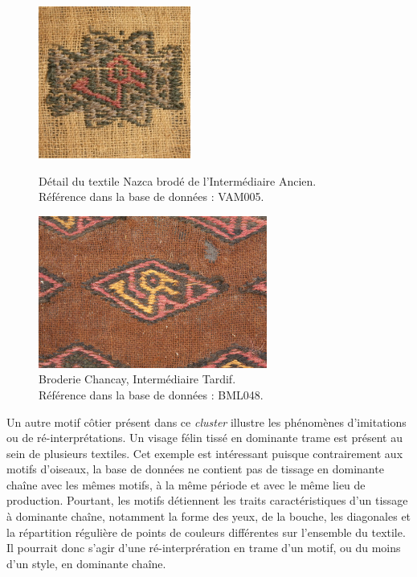 \begin{figure}[!h]
 \begin{minipage}[c]{.5\linewidth}
        \begin{center}
        		\includegraphics[width=5cm]{../images/VAM005_2.jpg}
		\caption{Détail du textile Nazca brodé de l'Intermédiaire Ancien. \\ Référence dans la base de données : VAM005.}
		\label{fig:VAM005_2}
	\end{center}
    \end{minipage}
    \hspace{5pt}
    \begin{minipage}[c]{.5\linewidth}
        \begin{center}
        		\includegraphics[height=5cm]{../images/BML048.jpg}
		\caption{Broderie Chancay, Intermédiaire Tardif.\\ Référence dans la base de données : BML048.}
		\label{fig:BML048}
	\end{center}
    \end{minipage}
\end{figure}

Un autre motif côtier présent dans ce \textit{cluster} illustre les phénomènes d'imitations ou de ré-interprétations. Un visage félin tissé en dominante trame est présent au sein de plusieurs textiles. Cet exemple est intéressant puisque contrairement aux motifs d'oiseaux, la base de données ne contient pas de tissage en dominante chaîne avec les mêmes motifs, à la même période et avec le même lieu de production. Pourtant, les motifs détiennent les traits caractéristiques d'un tissage à dominante chaîne, notamment la forme des yeux, de la bouche, les diagonales et la répartition régulière de points de couleurs différentes sur l'ensemble du textile. Il pourrait donc s'agir d'une ré-interprération en trame d'un motif, ou du moins d'un style, en dominante chaîne.

